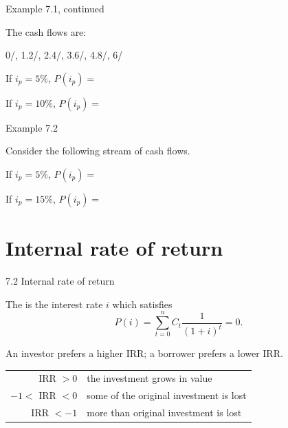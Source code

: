 \documentclass{beamer}
\begin{document}
\begin{frame}{Example 7.1, continued}

The cash flows are:

\begin{center}
%
  {0/, 1.2/, 2.4/, 3.6/, 4.8/, 6/}
\end{center}

If $i_p = 5\%$, $P(i_p) =$

\vfill
If $i_p = 10\%$, $P(i_p) =$

\vfill
\end{frame}

\begin{frame}{Example 7.2}

Consider the following stream of cash flows.

\begin{center}
\end{center}

If $i_p = 5\%$, $P(i_p) =$

\vfill
If $i_p = 15\%$, $P(i_p) =$

\vfill
\end{frame}

\section{Internal rate of return}

\begin{frame}{7.2 Internal rate of return}

The  is the interest rate $i$ which satisfies
\[
P(i) = \sum_{t=0}^{n} C_t \frac{1}{(1+i)^t} = 0.
\]

An investor prefers a higher IRR; a borrower prefers a lower IRR.

\medskip
\begin{tabular}{rl}
IRR $> 0$ & the investment grows in value \\
$-1 <$ IRR $< 0$ & some of the original investment is lost \\
IRR $< -1$ & more than original investment is lost \\
\end{tabular}

\end{frame}
\end{document}
